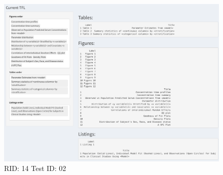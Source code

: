 \begin{figure}[H]
\includegraphics[width=.8\textwidth]{screencaps/14-02-1.png}
\caption{RID: 14 Test ID: 02}
\end{figure}
